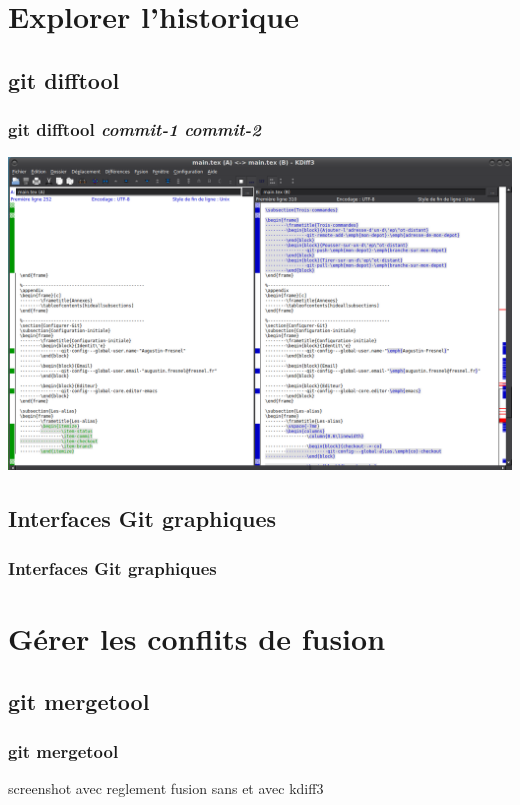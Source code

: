 \documentclass[t,11pt]{beamer}
\begin{document}
\section{Explorer l'historique}
\subsection{git difftool}
\begin{frame}
        \frametitle{git difftool \emph{commit-1} \emph{commit-2}}
        \centering
        \includegraphics[width=\linewidth,height=0.8\textheight,keepaspectratio]{./img/git-difftool-kdiff3.png}
\end{frame}

\subsection{Interfaces Git graphiques}
\begin{frame}
        \frametitle{Interfaces Git graphiques}
\end{frame}


\section{G\'erer les conflits de fusion}
\subsection{git mergetool}
\begin{frame}
        \frametitle{git mergetool}
        screenshot avec reglement fusion
        sans et avec kdiff3
\end{frame}
\end{document}
